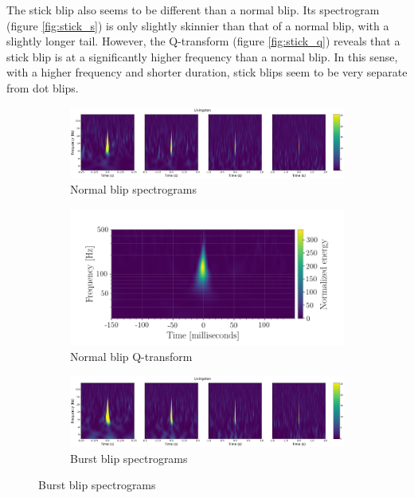 \documentclass[a4paper]{article}
\begin{document}
The stick blip also seems to be different than a normal blip. Its spectrogram (figure \ref{fig:stick_s}) is only slightly skinnier than that of a normal blip, with a slightly longer tail. However, the Q-transform (figure \ref{fig:stick_q}) reveals that a stick blip is at a significantly higher frequency than a normal blip. In this sense, with a higher frequency and shorter duration, stick blips seem to be very separate from dot blips.


\begin{figure}
	\centering
	\begin{subfigure}[t]{.7\textwidth}
		\centering
		\includegraphics[width=.9\linewidth]{normal_blip_spect}
		\caption{Normal blip spectrograms}
		\label{fig:normal_s}
	\end{subfigure}
	\begin{subfigure}[t]{.29\textwidth}
		\centering
		\includegraphics[width=1.1\linewidth]{normal_blip}
		\caption{Normal blip Q-transform}
		\label{fig:normal_q}
	\end{subfigure}
	\begin{subfigure}[t]{.7\textwidth}
		\centering
		\includegraphics[width=.9\linewidth]{burst_blip_spect}
		\caption{Burst blip spectrograms}
		\label{fig:burst_s}

\end{subfigure}
\end{figure}
\end{document}
